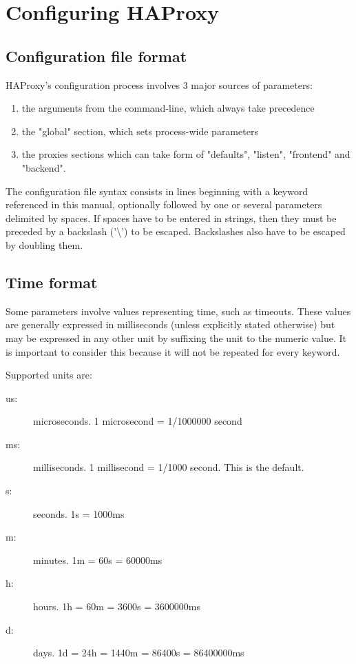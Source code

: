 \chapter{Configuring HAProxy}
\section{Configuration file format}
\begin{samepage}
HAProxy's configuration process involves 3 major sources of parameters:
\begin{enumerate}
\item the arguments from the command-line, which always take precedence
\item the "global" section, which sets process-wide parameters
\item the proxies sections which can take form of "defaults", "listen",
    "frontend" and "backend".
\end{enumerate}
\end{samepage}

The configuration file syntax consists in lines beginning with a keyword
referenced in this manual, optionally followed by one or several parameters
delimited by spaces. If spaces have to be entered in strings, then they must be
preceded by a backslash ('\textbackslash') to be escaped. Backslashes also have to be
escaped by doubling them.

\section{Time format}
Some parameters involve values representing time, such as timeouts. These
values are generally expressed in milliseconds (unless explicitly stated
otherwise) but may be expressed in any other unit by suffixing the unit to the
numeric value. It is important to consider this because it will not be repeated
for every keyword.

\begin{samepage}
\vspace{5mm}
Supported units are:
\begin{description}
\item[us:] microseconds. 1 microsecond = 1/1000000 second
\item[ms:] milliseconds. 1 millisecond = 1/1000 second. This is the default.
\item[s:]  seconds. 1s = 1000ms
\item[m:]  minutes. 1m = 60s = 60000ms
\item[h:]  hours.   1h = 60m = 3600s = 3600000ms
\item[d:]  days.    1d = 24h = 1440m = 86400s = 86400000ms
\end{description}
\end{samepage}


